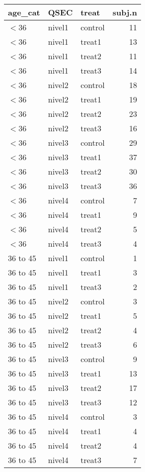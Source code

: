 \begin{tabular}{lllr}
  \hline
age\_cat & QSEC & treat & subj.n \\ 
  \hline
$<$36 & nivel1 & control &  11 \\ 
  $<$36 & nivel1 & treat1 &  13 \\ 
  $<$36 & nivel1 & treat2 &  11 \\ 
  $<$36 & nivel1 & treat3 &  14 \\ 
  $<$36 & nivel2 & control &  18 \\ 
  $<$36 & nivel2 & treat1 &  19 \\ 
  $<$36 & nivel2 & treat2 &  23 \\ 
  $<$36 & nivel2 & treat3 &  16 \\ 
  $<$36 & nivel3 & control &  29 \\ 
  $<$36 & nivel3 & treat1 &  37 \\ 
  $<$36 & nivel3 & treat2 &  30 \\ 
  $<$36 & nivel3 & treat3 &  36 \\ 
  $<$36 & nivel4 & control &   7 \\ 
  $<$36 & nivel4 & treat1 &   9 \\ 
  $<$36 & nivel4 & treat2 &   5 \\ 
  $<$36 & nivel4 & treat3 &   4 \\ 
  36 to 45 & nivel1 & control &   1 \\ 
  36 to 45 & nivel1 & treat1 &   3 \\ 
  36 to 45 & nivel1 & treat3 &   2 \\ 
  36 to 45 & nivel2 & control &   3 \\ 
  36 to 45 & nivel2 & treat1 &   5 \\ 
  36 to 45 & nivel2 & treat2 &   4 \\ 
  36 to 45 & nivel2 & treat3 &   6 \\ 
  36 to 45 & nivel3 & control &   9 \\ 
  36 to 45 & nivel3 & treat1 &  13 \\ 
  36 to 45 & nivel3 & treat2 &  17 \\ 
  36 to 45 & nivel3 & treat3 &  12 \\ 
  36 to 45 & nivel4 & control &   3 \\ 
  36 to 45 & nivel4 & treat1 &   4 \\ 
  36 to 45 & nivel4 & treat2 &   4 \\ 
  36 to 45 & nivel4 & treat3 &   7 \\ 

\end{tabular}
